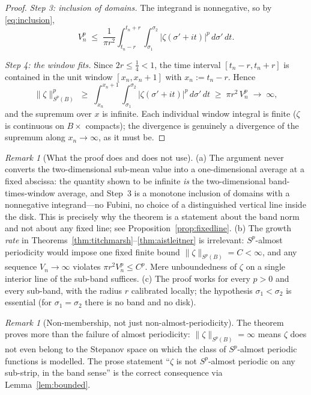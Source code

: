 \documentclass[11pt]{amsart}
\theoremstyle{definition}
\theoremstyle{remark}
\newtheorem{remark}[theorem]{Remark}
\begin{document}
\begin{proof}
\medskip
\emph{Step 3: inclusion of domains.}
The integrand is nonnegative, so by \eqref{eq:inclusion},
\[
V_n^p\;\leq\;\frac{1}{\pi r^2}
\int_{t_n-r}^{t_n+r}\!\!\int_{\sigma_1}^{\sigma_2}
|\zeta(\sigma'+it)|^p\,d\sigma'\,dt .
\]

\medskip
\emph{Step 4: the window fits.}
Since $2r\leq\tfrac14<1$, the time interval $[t_n-r,t_n+r]$ is
contained in the unit window $[x_n,x_n+1]$ with $x_n:=t_n-r$. Hence
\[
\|\zeta\|_{S^p(B)}^p\;\geq\;
\int_{x_n}^{x_n+1}\!\!\int_{\sigma_1}^{\sigma_2}
|\zeta(\sigma'+it)|^p\,d\sigma'\,dt
\;\geq\;\pi r^2\,V_n^p\;\longrightarrow\;\infty ,
\]
and the supremum over $x$ is infinite. Each individual window integral
is finite ($\zeta$ is continuous on $B\times$ compacts); the
divergence is genuinely a divergence of the supremum along
$x_n\to\infty$, as it must be.
\end{proof}

\begin{remark}[What the proof does and does not use]\label{rem:robust}
(a) The argument never converts the two-dimensional sub-mean value
into a one-dimensional average at a fixed abscissa: the quantity shown
to be infinite \emph{is} the two-dimensional band-times-window
average, and Step~3 is a monotone inclusion of domains with a
nonnegative integrand---no Fubini, no choice of a distinguished
vertical line inside the disk. This is precisely why the theorem is a
statement about the band norm and not about any fixed line; see
Proposition~\ref{prop:fixedline}.
(b) The growth \emph{rate} in
Theorems~\ref{thm:titchmarsh}--\ref{thm:aistleitner} is irrelevant:
$S^p$-almost periodicity would impose one fixed finite bound
$\|\zeta\|_{S^p(B)}=C<\infty$, and any sequence $V_n\to\infty$
violates $\pi r^2 V_n^p\leq C^p$. Mere unboundedness of $\zeta$ on a
single interior line of the sub-band suffices.
(c) The proof works for every $p>0$ and every sub-band, with the
radius $r$ calibrated locally; the hypothesis $\sigma_1<\sigma_2$ is
essential (for $\sigma_1=\sigma_2$ there is no band and no disk).
\end{remark}

\begin{remark}[Non-membership, not just non-almost-periodicity]
The theorem proves more than the failure of almost periodicity:
$\|\zeta\|_{S^p(B)}=\infty$ means $\zeta$ does not even belong to the
Stepanov space on which the class of $S^p$-almost periodic functions
is modelled. The prose statement ``$\zeta$ is not $S^p$-almost
periodic on any sub-strip, in the band sense'' is the correct
consequence via Lemma~\ref{lem:bounded}.
\end{remark}
\end{document}

